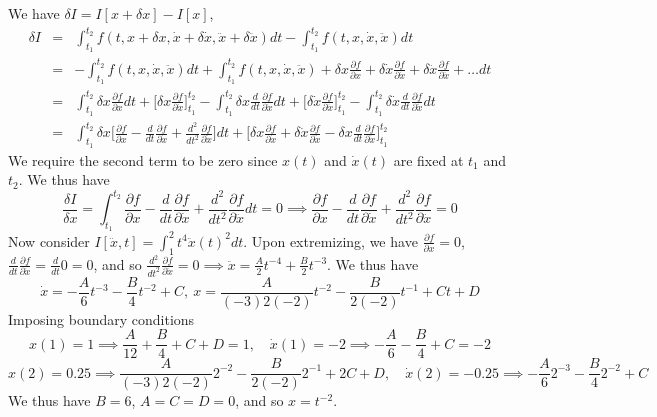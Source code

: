 \documentclass[a4paper]{article}
\begin{document}
\begin{ans}
We have $\delta I=I[x+\delta x]-I[x]$,
\begin{eqnarray}
\delta I&=&\int_{t_1}^{t_2}f(t,x+\delta x,\dot{x}+\delta\dot{x},\ddot{x}+\delta\ddot{x})dt-\int_{t_1}^{t_2}f(t,x,\dot{x},\ddot{x})dt\nonumber\\&=&-\int_{t_1}^{t_2}f(t,x,\dot{x},\ddot{x})dt+\int_{t_1}^{t_2}f(t,x,\dot{x},\ddot{x})+\delta x\frac{\partial f}{\partial x}+\delta\dot{x}\frac{\partial f}{\partial\dot{x}}+\delta\ddot{x}\frac{\partial f}{\partial\ddot{x}}+\dots dt\nonumber\\&=&\int_{t_1}^{t_2}\delta x\frac{\partial f}{\partial x}dt+\bigg[\delta x\frac{\partial f}{\partial\dot{x}}\bigg]_{t_1}^{t_2}-\int_{t_1}^{t_2}\delta x\frac{d}{dt}\frac{\partial f}{\partial\dot{x}}dt+\bigg[\delta\dot{x}\frac{\partial f}{\partial\ddot{x}}\bigg]_{t_1}^{t_2}-\int_{t_1}^{t_2}\delta\dot{x}\frac{d}{dt}\frac{\partial f}{\partial\ddot{x}}dt\nonumber\\&=&\int_{t_1}^{t_2}\delta x\bigg[\frac{\partial f}{\partial x}-\frac{d}{dt}\frac{\partial f}{\partial\dot{x}}+\frac{d^2}{dt^2}\frac{\partial f}{\partial\ddot{x}}\bigg]dt+\bigg[\delta x\frac{\partial f}{\partial\dot{x}}+\delta\dot{x}\frac{\partial f}{\partial\ddot{x}}-\delta x\frac{d}{dt}\frac{\partial f}{\partial\ddot{x}}\bigg]_{t_1}^{t_2}\nonumber
\end{eqnarray}
We require the second term to be zero since $x(t)$ and $\dot{x}(t)$ are fixed at $t_1$ and $t_2$. We thus have
$$\frac{\delta I}{\delta x}=\int_{t_1}^{t_2}\frac{\partial f}{\partial x}-\frac{d}{dt}\frac{\partial f}{\partial\dot{x}}+\frac{d^2}{dt^2}\frac{\partial f}{\partial\ddot{x}}dt=0\implies \frac{\partial f}{\partial x}-\frac{d}{dt}\frac{\partial f}{\partial\dot{x}}+\frac{d^2}{dt^2}\frac{\partial f}{\partial\ddot{x}}=0$$
Now consider $I[\ddot{x},t]=\int_1^2t^4\ddot{x}(t)^2dt$. Upon extremizing, we have $\frac{\partial f}{\partial x}=0$, $\frac{d}{dt}\frac{\partial f}{\partial\dot{x}}=\frac{d}{dt}0=0$, and so $\frac{d^2}{dt^2}\frac{\partial f}{\partial\ddot{x}}=0\implies \ddot{x}=\frac{A}{2}t^{-4}+\frac{B}{2}t^{-3}$. We thus have
$$\dot{x}=-\frac{A}{6}t^{-3}-\frac{B}{4}t^{-2}+C,~x=\frac{A}{(-3)2(-2)}t^{-2}-\frac{B}{2(-2)}t^{-1}+Ct+D$$
Imposing boundary conditions $$x(1)=1\implies \frac{A}{12}+\frac{B}{4}+C+D=1,\quad \dot{x}(1)=-2\implies-\frac{A}{6}-\frac{B}{4}+C=-2$$ $$x(2)=0.25\implies\frac{A}{(-3)2(-2)}2^{-2}-\frac{B}{2(-2)}2^{-1}+2C+D,\quad\dot{x}(2)=-0.25\implies-\frac{A}{6}2^{-3}-\frac{B}{4}2^{-2}+C$$
We thus have $B=6$, $A=C=D=0$, and so $x=t^{-2}$.
\end{ans}
\end{document}
